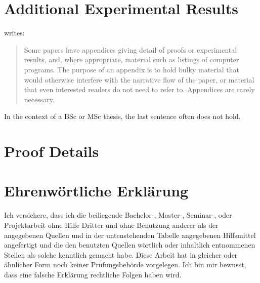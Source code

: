 \documentclass[a4paper,oneside,bibliography=totoc]{scrbook}
\begin{document}
\begingroup%
\hypersetup{hidelinks}%
\tableofcontents%
\endgroup



\mainmatter











\appendix
\chapter{Additional Experimental Results}

\citet{zobel2004} writes:

\blockcquote{zobel2004}{%
  Some papers have appendices giving detail of proofs or experimental results,
  and, where appropriate, material such as listings of computer programs. The
  purpose of an appendix is to hold bulky material that would otherwise
  interfere with the narrative flow of the paper, or material that even
  interested readers do not need to refer to. Appendices are rarely necessary.}

In the context of a BSc or MSc thesis, the last sentence often does not hold.

\chapter{Proof Details}

\backmatter
\chapter{Ehrenwörtliche Erklärung}

Ich versichere, dass ich die beiliegende Bachelor-, Master-, Seminar-, oder
Projektarbeit ohne Hilfe Dritter und ohne Benutzung anderer als der angegebenen
Quellen und in der untenstehenden Tabelle angegebenen Hilfsmittel angefertigt
und die den benutzten Quellen wörtlich oder inhaltlich entnommenen Stellen als
solche kenntlich gemacht habe. Diese Arbeit hat in gleicher oder ähnlicher Form
noch keiner Prüfungsbehörde vorgelegen. Ich bin mir bewusst, dass eine falsche
Erklärung rechtliche Folgen haben wird.
\end{document}

